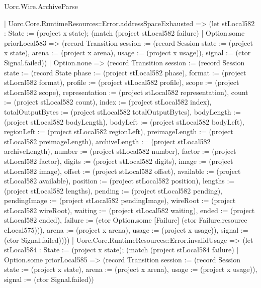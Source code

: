 \begin{lexlean}{Uorc.Wire.ArchiveParse}
\begin{semanticmodule}
{      | Uorc.Core.RuntimeResources::Error.addressSpaceExhausted => (let stLocal582 : State := (project x state); (match (project stLocal582 failure)
        | Option.some priorLocal583 => (record Transition {session := (record Session {state := (project x state), arena := (project x arena), usage := (project x usage)}), signal := (ctor Signal.failed)})
        | Option.none => (record Transition {session := (record Session {state := (record State {phase := (project stLocal582 phase), format := (project stLocal582 format), profile := (project stLocal582 profile), scope := (project stLocal582 scope), representation := (project stLocal582 representation), count := (project stLocal582 count), index := (project stLocal582 index), totalOutputBytes := (project stLocal582 totalOutputBytes), bodyLength := (project stLocal582 bodyLength), bodyLeft := (project stLocal582 bodyLeft), regionLeft := (project stLocal582 regionLeft), preimageLength := (project stLocal582 preimageLength), archiveLength := (project stLocal582 archiveLength), number := (project stLocal582 number), factor := (project stLocal582 factor), digits := (project stLocal582 digits), image := (project stLocal582 image), offset := (project stLocal582 offset), available := (project stLocal582 available), position := (project stLocal582 position), lengths := (project stLocal582 lengths), pending := (project stLocal582 pending), pendingImage := (project stLocal582 pendingImage), wireRoot := (project stLocal582 wireRoot), waiting := (project stLocal582 waiting), ended := (project stLocal582 ended), failure := (ctor Option.some [Failure] (ctor Failure.resource eLocal575))}), arena := (project x arena), usage := (project x usage)}), signal := (ctor Signal.failed)})))
      | Uorc.Core.RuntimeResources::Error.invalidUsage => (let stLocal584 : State := (project x state); (match (project stLocal584 failure)
        | Option.some priorLocal585 => (record Transition {session := (record Session {state := (project x state), arena := (project x arena), usage := (project x usage)}), signal := (ctor Signal.failed)})
}
\end{semanticmodule}
\end{lexlean}
